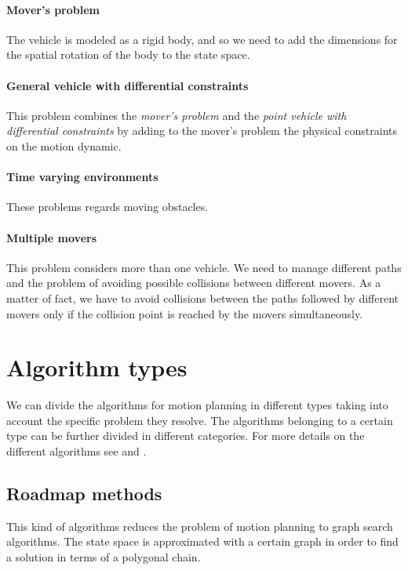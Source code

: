 \documentclass[dissertation.tex]{subfiles}
\begin{document}
\paragraph{Mover's problem}
The vehicle is modeled as a rigid body, and so we need to add the
dimensions for the spatial rotation of the body to the state
space.

\paragraph{General vehicle with differential constraints}
This problem combines the \emph{mover's problem} and the \emph{point
  vehicle with 
differential constraints} by adding to the mover's
problem the physical constraints on the motion dynamic.

\paragraph{Time varying environments}
These problems regards moving obstacles.

\paragraph{Multiple movers}
This problem considers more than one vehicle. We need
to manage
different paths and the problem of avoiding possible
collisions between different movers. As a matter of fact, we have to
avoid
collisions between the paths followed by different movers only if
the collision point is reached by the movers simultaneously.

\section{Algorithm types}
We can divide the algorithms for motion planning in different types
taking into account the specific problem they resolve. The algorithms
belonging to a certain type can be further divided
in different categories.
For more details on the different algorithms see \cite{goerzen} and
\cite{choset}.

\subsection{Roadmap methods}
This kind of algorithms reduces the problem of motion planning to
graph search algorithms. The state space is approximated with a
certain graph in order to find a solution in terms of a polygonal
chain.
\end{document}
